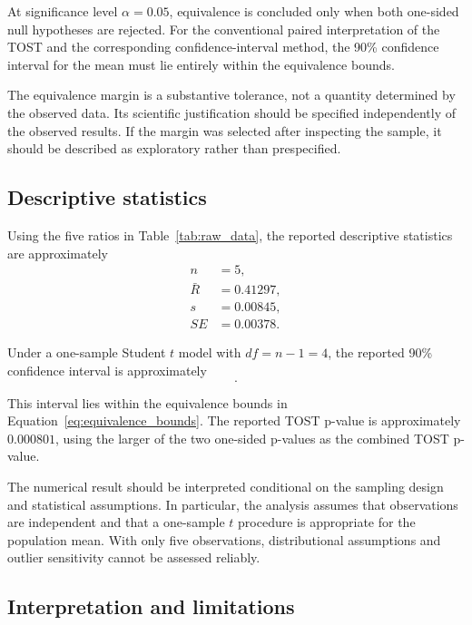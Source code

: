 \documentclass[11pt,a4paper]{article}
\begin{document}
At significance level \(\alpha=0.05\), equivalence is concluded
only when both one-sided null hypotheses are rejected.
For the conventional paired interpretation of the TOST and
the corresponding confidence-interval method, the 90\%
confidence interval for the mean must lie entirely within
the equivalence bounds.

The equivalence margin is a substantive tolerance, not a
quantity determined by the observed data. Its scientific
justification should be specified independently of the
observed results. If the margin was selected after inspecting
the sample, it should be described as exploratory rather than
prespecified.

\subsection{Descriptive statistics}

Using the five ratios in Table~\ref{tab:raw_data}, the reported
descriptive statistics are approximately
\begin{align*}
    n&=5,\\
    \bar{R}&=0.41297,\\
    s&=0.00845,\\
    SE&=0.00378.
\end{align*}

Under a one-sample Student \(t\) model with \(df=n-1=4\),
the reported 90\% confidence interval is approximately
\begin{equation}
    [0.40491,\ 0.42102].
    \label{eq:ci}
\end{equation}

This interval lies within the equivalence bounds in
Equation~\eqref{eq:equivalence_bounds}. The reported TOST
p-value is approximately \(0.000801\), using the larger of
the two one-sided p-values as the combined TOST p-value.

The numerical result should be interpreted conditional on
the sampling design and statistical assumptions. In
particular, the analysis assumes that observations are
independent and that a one-sample \(t\) procedure is
appropriate for the population mean. With only five
observations, distributional assumptions and outlier
sensitivity cannot be assessed reliably.

\subsection{Interpretation and limitations}
\end{document}
